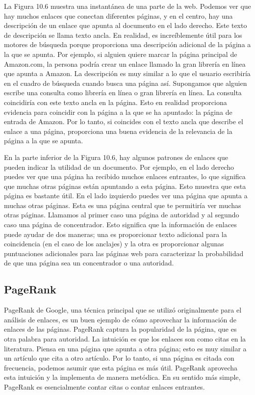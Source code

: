 La Figura 10.6 muestra una instantánea de una parte de la web. Podemos ver que hay muchos enlaces que conectan diferentes páginas, y en el centro, hay una descripción de un enlace que apunta al documento en el lado derecho. Este texto de descripción se llama texto ancla. En realidad, es increíblemente útil para los motores de búsqueda porque proporciona una descripción adicional de la página a la que se apunta. Por ejemplo, si alguien quiere marcar la página principal de Amazon.com, la persona podría crear un enlace llamado la gran librería en línea que apunta a Amazon. La descripción es muy similar a lo que el usuario escribiría en el cuadro de búsqueda cuando busca una página así. Supongamos que alguien escribe una consulta como librería en línea o gran librería en línea. La consulta coincidiría con este texto ancla en la página. Esto en realidad proporciona evidencia para coincidir con la página a la que se ha apuntado: la página de entrada de Amazon. Por lo tanto, si coincides con el texto ancla que describe el enlace a una página, proporciona una buena evidencia de la relevancia de la página a la que se apunta.

En la parte inferior de la Figura 10.6, hay algunos patrones de enlaces que pueden indicar la utilidad de un documento. Por ejemplo, en el lado derecho puedes ver que una página ha recibido muchos enlaces entrantes, lo que significa que muchas otras páginas están apuntando a esta página. Esto muestra que esta página es bastante útil. En el lado izquierdo puedes ver una página que apunta a muchas otras páginas. Esta es una página central que te permitiría ver muchas otras páginas. Llamamos al primer caso una página de autoridad y al segundo caso una página de concentrador. Esto significa que la información de enlaces puede ayudar de dos maneras; una es proporcionar texto adicional para la coincidencia (en el caso de los anclajes) y la otra es proporcionar algunas puntuaciones adicionales para las páginas web para caracterizar la probabilidad de que una página sea un concentrador o una autoridad.

\subsection{PageRank}
PageRank de Google, una técnica principal que se utilizó originalmente para el análisis de enlaces, es un buen ejemplo de cómo aprovechar la información de enlaces de las páginas. PageRank captura la popularidad de la página, que es otra palabra para autoridad. La intuición es que los enlaces son como citas en la literatura. Piensa en una página que apunta a otra página; esto es muy similar a un artículo que cita a otro artículo. Por lo tanto, si una página es citada con frecuencia, podemos asumir que esta página es más útil. PageRank aprovecha esta intuición y la implementa de manera metódica. En su sentido más simple, PageRank es esencialmente contar citas o contar enlaces entrantes.

